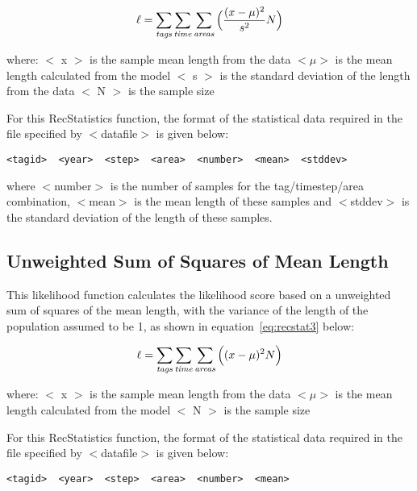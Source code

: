 \documentclass[10pt,twoside]{book}
\begin{document}
\begin{equation}\label{eq:recstat2}
\ell = \sum_{\it tags}\sum_{\it time}\sum_{\it areas} \Big(\frac{(x-\mu)^2} {s^2} N\Big)
\end{equation}

where:\newline
$<$ x $>$ is the sample mean length from the data\newline
$<\mu>$ is the mean length calculated from the model\newline
$<$ s $>$ is the standard deviation of the length from the data\newline
$<$ N $>$ is the sample size

\bigskip
For this RecStatistics function, the format of the statistical data required in the file specified by $<$datafile$>$ is given below:

{\small\begin{verbatim}
<tagid>  <year>  <step>  <area>  <number>  <mean>  <stddev>
\end{verbatim}}

where $<$number$>$ is the number of samples for the tag/timestep/area combination, $<$mean$>$ is the mean length of these samples and $<$stddev$>$ is the standard deviation of the length of these samples.

\subsection{Unweighted Sum of Squares of Mean Length}
This likelihood function calculates the likelihood score based on a unweighted sum of squares of the mean length, with the variance of the length of the population assumed to be 1, as shown in equation~\ref{eq:recstat3} below:

\begin{equation}\label{eq:recstat3}
\ell = \sum_{\it tags}\sum_{\it time}\sum_{\it areas} \Big((x-\mu)^2 N\Big)
\end{equation}

where:\newline
$<$ x $>$ is the sample mean length from the data\newline
$<\mu>$ is the mean length calculated from the model\newline
$<$ N $>$ is the sample size

\bigskip
For this RecStatistics function, the format of the statistical data required in the file specified by $<$datafile$>$ is given below:

{\small\begin{verbatim}
<tagid>  <year>  <step>  <area>  <number>  <mean>
\end{verbatim}}
\end{document}
